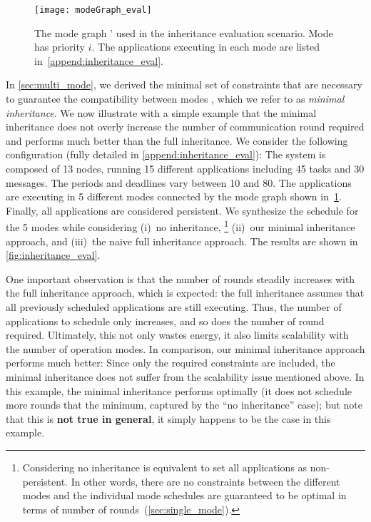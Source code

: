 \begin{figure}
  \centering
  \texttt{[image: modeGraph\_eval]}
  \caption{The mode graph \modeGraph' used in the inheritance evaluation scenario.
  Mode \modei has priority $i$. The applications executing in each mode are listed in~\cref{append:inheritance_eval}.}
  \label{fig:modeGraph_eval}
\end{figure}


In \cref{sec:multi_mode}, we derived the minimal set of constraints that are necessary to guarantee the compatibility between modes , which we refer to as \emph{minimal inheritance}.
We now illustrate with a simple example that the minimal inheritance does not overly increase the number of communication round required and performs much better than the full inheritance.
%
We consider the following configuration (fully detailed in \cref{append:inheritance_eval}): The system is composed of 13 nodes, running 15 different applications including 45 tasks and 30 messages.
The periods and deadlines vary between 10 and 80\s. The applications are executing in 5 different modes connected by the mode graph shown in~\cref{fig:modeGraph_eval}.
Finally, all applications are considered persistent.
We synthesize the schedule for the 5 modes while considering
(i)~no inheritance,%
%
\footnote{Considering no inheritance is equivalent to set all applications as non-persistent. In other words, there are no constraints between the different modes and the individual mode schedules are guaranteed to be optimal in terms of number of rounds~(\cref{sec:single_mode}).}
%
(ii)~our minimal inheritance approach, and (iii)~the naive full inheritance approach.
The results are shown in \cref{fig:inheritance_eval}.

One important observation is that the number of rounds steadily increases with the full inheritance approach, which is expected: the full inheritance assumes that all previously scheduled applications are still executing. Thus, the number of applications to schedule only increases, and so does the number of round required. Ultimately, this not only wastes energy, it also limits scalability with the number of operation modes.
In comparison, our minimal inheritance approach performs much better: Since only the required constraints are included, the minimal inheritance does not suffer from the scalability issue mentioned above. In this example, the minimal inheritance performs optimally (\ie it does not schedule more rounds that the minimum, captured by the ``no inheritance'' case); but note that this is {\bf not true in general}, it simply happens to be the case in this example.

